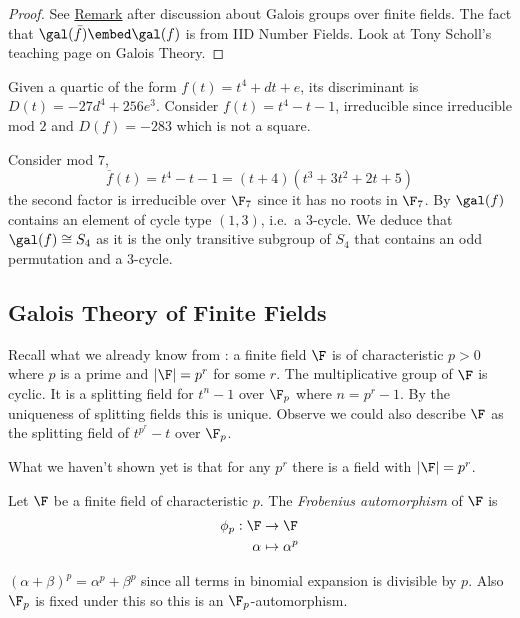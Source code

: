 \documentclass[a4paper]{article}
\newcommand*{\red}[1]{\overline{#1}}
\begin{document}
\begin{proof}
  See \hyperref[rmk:mod p reduction]{Remark} after discussion about Galois groups over finite fields. The fact that \(\gal(\bar f) \embed \gal(f)\) is from IID Number Fields. Look at Tony Scholl's teaching page on Galois Theory.
\end{proof}

\begin{eg}
  Given a quartic of the form \(f(t) = t^4 + dt + e\), its discriminant is \(D(t) = -27d^4 + 256e^3\). Consider \(f(t) = t^4 - t -1\), irreducible since irreducible mod \(2\) and \(D(f) = -283\) which is not a square.

  Consider mod \(7\),
  \[
    \red f(t) = t^4 - t - 1 = (t + 4)(t^3 + 3t^2 + 2t + 5)
  \]
  the second factor is irreducible over \(\F_7\) since it has no roots in \(\F_7\). By  \(\gal(f)\) contains an element of cycle type \((1, 3)\), i.e.\ a \(3\)-cycle. We deduce that \(\gal(f) \cong S_4\) as it is the only transitive subgroup of \(S_4\) that contains an odd permutation and a \(3\)-cycle.
\end{eg}

\subsection{Galois Theory of Finite Fields}

Recall what we already know from : a finite field \(\F\) is of characteristic \(p > 0\) where \(p\) is a prime and \(|\F| = p^r\) for some \(r\). The multiplicative group of \(\F\) is cyclic. It is a splitting field for \(t^n - 1\) over \(\F_p\) where \(n = p^r - 1\). By the uniqueness of splitting fields this is unique. Observe we could also describe \(\F\) as the splitting field of \(t^{p^r} - t\) over \(\F_p\).

What we haven't shown yet is that for any \(p^r\) there is a field with \(|\F| = p^r\).

\begin{definition}
  Let \(\F\) be a finite field of characteristic \(p\). The \emph{Frobenius automorphism} of \(\F\) is
  \begin{align*}
    \phi_p: \F &\to \F \\
    \alpha &\mapsto \alpha^p
  \end{align*}
\end{definition}

\begin{remark}
  \((\alpha + \beta)^p = \alpha^p + \beta^p\) since all terms in binomial expansion is divisible by \(p\). Also \(\F_p\) is fixed under this so this is an \(\F_p\)-automorphism.
\end{remark}
\end{document}
